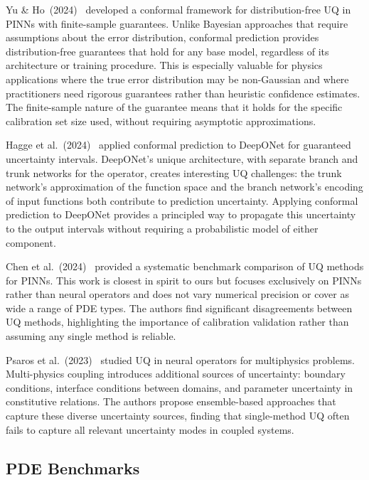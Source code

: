 \documentclass[12pt,a4paper]{article}
\theoremstyle{plain}
\begin{document}
Yu \& Ho~(2024)~\citep{yu2024conformal} developed a conformal framework for
distribution-free UQ in PINNs with finite-sample guarantees. Unlike Bayesian
approaches that require assumptions about the error distribution, conformal
prediction provides distribution-free guarantees that hold for any base model,
regardless of its architecture or training procedure. This is especially
valuable for physics applications where the true error distribution may be
non-Gaussian and where practitioners need rigorous guarantees rather than
heuristic confidence estimates. The finite-sample nature of the guarantee
means that it holds for the specific calibration set size used, without
requiring asymptotic approximations.

Hagge et al.~(2024)~\citep{hagge2024conformalized} applied conformal prediction
to DeepONet for guaranteed uncertainty intervals. DeepONet's unique
architecture, with separate branch and trunk networks for the operator,
creates interesting UQ challenges: the trunk network's approximation of the
function space and the branch network's encoding of input functions both
contribute to prediction uncertainty. Applying conformal prediction to
DeepONet provides a principled way to propagate this uncertainty to the
output intervals without requiring a probabilistic model of either component.

Chen et al.~(2024)~\citep{chen2024pinn} provided a systematic benchmark comparison
of UQ methods for PINNs. This work is closest in spirit to ours but focuses
exclusively on PINNs rather than neural operators and does not vary numerical
precision or cover as wide a range of PDE types. The authors find significant
disagreements between UQ methods, highlighting the importance of calibration
validation rather than assuming any single method is reliable.

Psaros et al.~(2023)~\citep{psaros2023uncertainty} studied UQ in neural operators
for multiphysics problems. Multi-physics coupling introduces additional
sources of uncertainty: boundary conditions, interface conditions between
domains, and parameter uncertainty in constitutive relations. The authors
propose ensemble-based approaches that capture these diverse uncertainty
sources, finding that single-method UQ often fails to capture all relevant
uncertainty modes in coupled systems.

\subsection{PDE Benchmarks}
\end{document}

